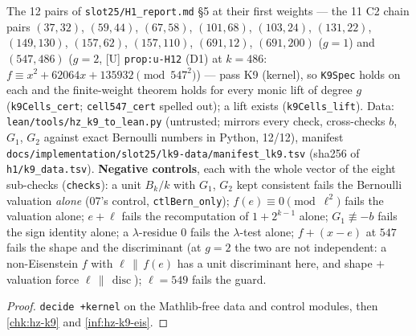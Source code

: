 \begin{theorem}\label{chk:hz-k9-cells}
  \leanok
  The 12 pairs of \texttt{slot25/H1\_report.md} \S5 at their first weights --- the 11 C2 chain pairs $(37,32)$, $(59,44)$, $(67,58)$, $(101,68)$,
  $(103,24)$, $(131,22)$, $(149,130)$, $(157,62)$, $(157,110)$, $(691,12)$, $(691,200)$ ($g=1$) and $(547,486)$ ($g=2$, [U] \texttt{prop:u-H12}
  (D1) at $k=486$: $f\equiv x^2+62064x+135932\pmod{547^2}$) --- pass K9 (kernel), so \texttt{K9Spec} holds on each and the finite-weight theorem
  holds for every monic lift of degree $g$ (\texttt{k9Cells\_cert}; \texttt{cell547\_cert} spelled out); a lift exists (\texttt{k9Cells\_lift}). Data:
  \texttt{lean/tools/hz\_k9\_to\_lean.py} (untrusted; mirrors every check, cross-checks $b$, $G_1$, $G_2$ against exact Bernoulli numbers in
  Python, 12/12), manifest \texttt{docs/implementation/slot25/lk9-data/manifest\_lk9.tsv} (sha256 of \texttt{h1/k9\_data.tsv}). \textbf{Negative
  controls}, each with the whole vector of the eight sub-checks (\texttt{checks}): a unit $B_k/k$ with $G_1$, $G_2$ kept consistent fails the
  Bernoulli valuation \emph{alone} (07's control, \texttt{ctlBern\_only}); $f(e)\equiv0\pmod{\ell^2}$ fails the valuation alone; $e+\ell$ fails the
  recomputation of $1+2^{k-1}$ alone; $G_1\not\equiv-b$ fails the sign identity alone; a $\lambda$-residue $0$ fails the $\lambda$-test alone;
  $f+(x-e)$ at $547$ fails the shape and the discriminant (at $g=2$ the two are not independent: a non-Eisenstein $f$ with $\ell\,\|\,f(e)$ has a unit
  discriminant here, and shape $+$ valuation force $\ell\,\|\,\operatorname{disc}$); $\ell=549$ fails the guard.
\end{theorem}
\begin{proof}
  \leanok
  \texttt{decide +kernel} on the Mathlib-free data and control modules, then \ref{chk:hz-k9} and \ref{inf:hz-k9-eis}.
\end{proof}

